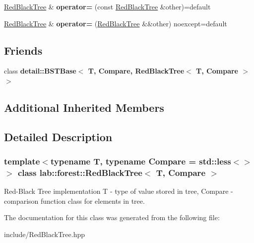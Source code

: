 \begin{DoxyCompactItemize}
\item 
\mbox{\label{classlab_1_1forest_1_1RedBlackTree_a903afb4432a34d898c818e97a2b18a26}} 
\hyperlink{classlab_1_1forest_1_1RedBlackTree}{Red\+Black\+Tree} \& {\bfseries operator=} (const \hyperlink{classlab_1_1forest_1_1RedBlackTree}{Red\+Black\+Tree} \&other)=default
\item 
\mbox{\label{classlab_1_1forest_1_1RedBlackTree_a1f2866ff748b05991b8c4d4501db64ca}} 
\hyperlink{classlab_1_1forest_1_1RedBlackTree}{Red\+Black\+Tree} \& {\bfseries operator=} (\hyperlink{classlab_1_1forest_1_1RedBlackTree}{Red\+Black\+Tree} \&\&other) noexcept=default
\end{DoxyCompactItemize}
\subsection*{Friends}
\begin{DoxyCompactItemize}
\item 
\mbox{\label{classlab_1_1forest_1_1RedBlackTree_a0366a00ceb99298e94189e0ae094e6d9}} 
class {\bfseries detail\+::\+B\+S\+T\+Base$<$ T, Compare, Red\+Black\+Tree$<$ T, Compare $>$ $>$}
\end{DoxyCompactItemize}
\subsection*{Additional Inherited Members}


\subsection{Detailed Description}
\subsubsection*{template$<$typename T, typename Compare = std\+::less$<$$>$$>$\newline
class lab\+::forest\+::\+Red\+Black\+Tree$<$ T, Compare $>$}

Red-\/\+Black Tree implementation T -\/ type of value stored in tree, Compare -\/ comparison function class for elements in tree. 

The documentation for this class was generated from the following file\+:\begin{DoxyCompactItemize}
\item 
include/Red\+Black\+Tree.\+hpp\end{DoxyCompactItemize}
